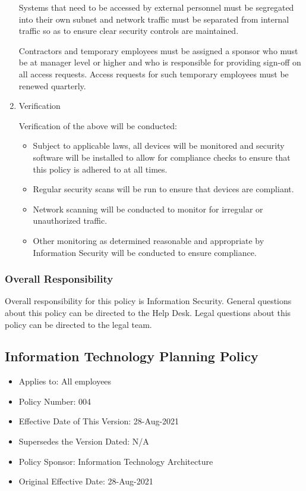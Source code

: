 \documentclass[stu]{apa7}
\begin{document}
\begin{enumerate}
Systems that need to be accessed by external personnel must be segregated into their own subnet and network traffic must be separated from internal traffic so as to ensure clear security controls are maintained.

Contractors and temporary employees must be assigned a sponsor who must be at manager level or higher and who is responsible for providing sign-off on all access requests. Access requests for such temporary employees must be renewed quarterly.

\item Verification
\label{sec:org4bbd990}

Verification of the above will be conducted:

\begin{itemize}
\item Subject to applicable laws, all devices will be monitored and security software will be installed to allow for compliance checks to ensure that this policy is adhered to at all times.
\item Regular security scans will be run to ensure that devices are compliant.
\item Network scanning will be conducted to monitor for irregular or unauthorized traffic.
\item Other monitoring as determined reasonable and appropriate by Information Security will be conducted to ensure compliance.
\end{itemize}
\end{enumerate}


\subsubsection{Overall Responsibility}
\label{sec:orga9afd41}

Overall responsibility for this policy is Information Security. General questions about this policy can be directed to the Help Desk. Legal questions about this policy can be directed to the legal team.

\subsection{Information Technology Planning Policy}
\label{sec:org8926eee}

\begin{itemize}
\item Applies to: All employees
\item Policy Number: 004
\item Effective Date of This Version: 28-Aug-2021
\item Supersedes the Version Dated: N/A
\item Policy Sponsor:  Information Technology Architecture
\item Original Effective Date: 28-Aug-2021
\end{itemize}
\end{document}
